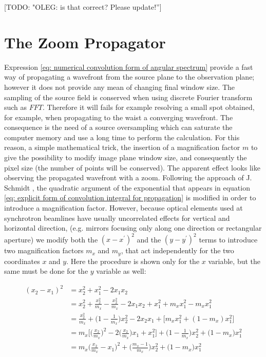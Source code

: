 \documentclass{iucr}              %
\newcommand{\todo}[1]{{\color{red}[TODO: "#1'']}}
\begin{document}
\todo{OLEG: is that correct? Please update!}


\section{The Zoom Propagator}
\label{appendix: zoom}

Expression \ref{eq: numerical convolution form of angular spectrum} provide a fast way of propagating a wavefront from the source plane to the observation plane; however it does not provide any mean of changing final window size. The sampling of the source field is conserved when using discrete Fourier transform such as $FFT$. Therefore it will fails for example resolving a small spot obtained, for example, when propagating to the waist a converging wavefront. The consequence is the need of a source oversampling which can saturate the computer memory and use a long time to perform the calculation. For this reason, a simple mathematical trick, the insertion of a magnification factor $m$ to give the possibility to modify image plane window size, and consequently the pixel size (the number of points will be conserved). The apparent effect looks like observing the propagated wavefront with a zoom. Following the approach of J. Schmidt \cite{schmidt}, the quadratic argument of the exponential that appears in equation \ref{eq: explicit form of convolution integral for propagation} is modified in order to introduce a magnification factor. However, because optical elements used at synchrotron beamlines have usually uncorrelated effects for vertical and horizontal direction, (e.g. mirrors focusing only along one direction or rectangular aperture) we modify both the $(x - x^\prime)^2$ and the $(y - y^\prime)^2$ terms to introduce two magnification factors $m_x$ and $m_y$, that act independently for the two coordinates $x$ and $y$. Here the procedure is shown only for the $x$ variable, but the same must be done for the $y$ variable as well: 

\begin{align}\label{eq:introduction of m factor}
(x_2 - x_1)^2 &= x_2^2 + x_1^2 -2 x_1 x_2 \nonumber \\
&=x_2^2 + \frac{x_2^2}{m_x} - \frac{x_2^2}{m_x} - 2 x_1 x_2 + x_1^2 + m_x x_1^2 - m_x x_1^2 \nonumber\\
&=\frac {x_2^2}{m_x} + \Big ( 1- \frac{1}{m_x}\Big) x_2^2 -2 x_2 x_1 + \Big [m_x x_1^2 + (1- m_x) x_1^2 \Big] \nonumber\\
&=m_x \Big [\Big(\frac{x_2}{m_x}\Big)^2 - 2 \Big( \frac{x_2}{m_x} \Big)x_1 + x_1^2\Big] + \Big(1-\frac{1}{m_x}\Big)x_2^2 + \Big(1-m_x\Big)x_1^2 \nonumber\\
&=m_x \Big (\frac{x_2}{m_x}-x_1\Big)^2 + \Big (\frac{m_x - 1}{m_x}\Big)x_2^2 + \Big(1-m_x\Big)x_1^2
\end{align}
\end{document}
